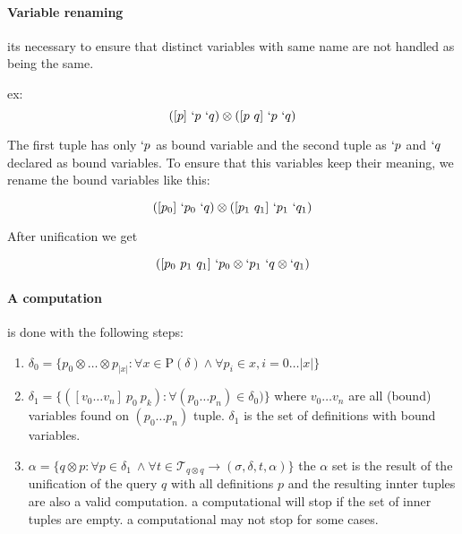 \documentclass[11pt,a4paper]{report}
\newcommand{\var}[1]{`#1}
\newcommand{\unify}{\otimes}
\begin{document}
\paragraph{Variable renaming} its necessary to ensure that distinct variables with same name are not handled as being the same.

ex:
\[
    ([p]\ \var{p}\ \var{q}) \unify ([p\ q]\ \var{p}\ \var{q})
\]

The first tuple has only $\var{p}$ as bound variable and the second tuple as $\var{p}$ and $\var{q}$ declared as bound variables.
To ensure that this variables keep their meaning, we rename the bound variables like this:

\[
    ([p_{0}]\ \var{p_{0}}\ \var{q}) \unify ([p_{1}\ q_{1}]\ \var{p_{1}}\ \var{q_{1}})
\]

After unification we get

\[
    ([p_{0}\ p_{1}\ q_{1}]\ \var{p_{0}} \unify \var{p_{1}}\ \var{q} \unify \var{q_{1}})
\]


\paragraph{A computation} is done with the following steps:

\begin{enumerate}
    \item $\delta_{0} = \{ p_{0} \unify \ldots \unify p_{|x|} : \forall x \in \mathrm{P}(\delta) \wedge \forall p_{i} \in x, i=0 \ldots |x| \}$
    \item $\delta_{1} = \{ ([v_{0} \ldots v_{n}]\ p_{0}\ p_{k}): \forall (p_{0} \ldots p_{n}) \in \delta_{0})\}$
    \subitem where $v_{0} \ldots v_{n}$ are all (bound) variables found on $(p_{0} \ldots p_{n})$ tuple.
    \subitem $\delta_{1}$ is the set of definitions with bound variables.
    \item $\alpha = \{q \unify p :\forall p \in \delta_{1}\ \wedge \forall t \in \mathcal{T}_{q \unify q} \rightarrow (\sigma, \delta, t, \alpha) \}$
    \subitem the $\alpha$ set is the result of the unification of the query $q$ with all definitions $p$ and the resulting innter tuples are
    also a valid computation.
    \subitem a computational will stop if the set of inner tuples are empty.
    \subitem a computational may not stop for some cases.
\end{enumerate}
\end{document}
